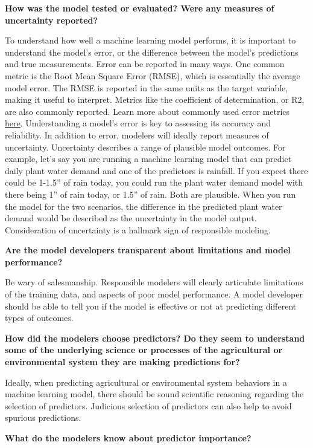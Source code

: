 \documentclass[
]{book}
\begin{document}
\textbf{How was the model tested or evaluated? Were any measures of uncertainty reported?}

To understand how well a machine learning model performs, it is important to understand the model's error, or the difference between the model's predictions and true measurements. Error can be reported in many ways. One common metric is the Root Mean Square Error (RMSE), which is essentially the average model error. The RMSE is reported in the same units as the target variable, making it useful to interpret. Metrics like the coefficient of determination, or R2, are also commonly reported. Learn more about commonly used error metrics \href{https://medium.com/@brandon93.w/regression-model-evaluation-metrics-r-squared-adjusted-r-squared-mse-rmse-and-mae-24dcc0e4cbd3}{here}. Understanding a model's error is key to assessing its accuracy and reliability. In addition to error, modelers will ideally report measures of uncertainty. Uncertainty describes a range of plausible model outcomes. For example, let's say you are running a machine learning model that can predict daily plant water demand and one of the predictors is rainfall. If you expect there could be 1-1.5'' of rain today, you could run the plant water demand model with there being 1'' of rain today, or 1.5'' of rain. Both are plausible. When you run the model for the two scenarios, the difference in the predicted plant water demand would be described as the uncertainty in the model output. Consideration of uncertainty is a hallmark sign of responsible modeling.

\textbf{Are the model developers transparent about limitations and model performance?}

Be wary of salesmanship. Responsible modelers will clearly articulate limitations of the training data, and aspects of poor model performance. A model developer should be able to tell you if the model is effective or not at predicting different types of outcomes.

\textbf{How did the modelers choose predictors? Do they seem to understand some of the underlying science or processes of the agricultural or environmental system they are making predictions for?}

Ideally, when predicting agricultural or environmental system behaviors in a machine learning model, there should be sound scientific reasoning regarding the selection of predictors. Judicious selection of predictors can also help to avoid spurious predictions.

\textbf{What do the modelers know about predictor importance?}
\end{document}
